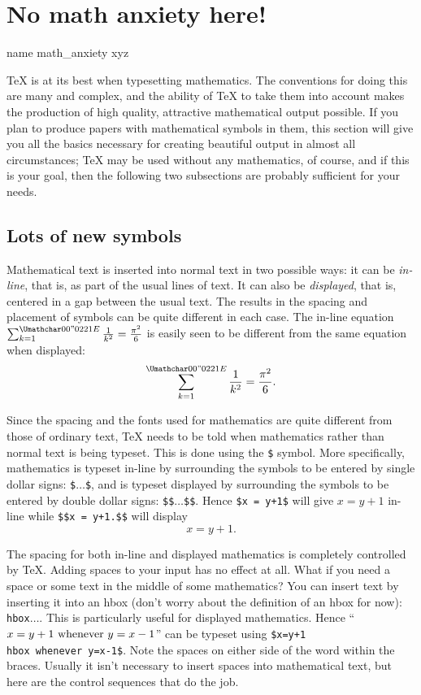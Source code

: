 \section{No math anxiety here!} 
\pdfdest name {math_anxiety} xyz

\TeX{} is at its best when typesetting mathematics.  The 
conventions for doing this are many and complex, and the ability 
of \TeX{} to take them into account makes the production of high 
quality, attractive mathematical output possible.  If you plan to 
produce papers with mathematical symbols in them, this section 
will give you all the basics necessary for creating beautiful 
output in almost all circumstances; \TeX{} may be used without 
any mathematics, of course, and if this is your goal, then the 
following two subsections are probably sufficient for your needs. 

\subsection{Lots of new symbols} 

Mathematical text is inserted into normal text in two possible 
ways: it can be {\sl in-line\/}, that is, as part of the usual 
lines of text.  It can also be {\sl displayed}, that is, centered{} 
in a gap between the usual text.  The results in the spacing and 
placement of symbols can be quite different in each case.  The 
in-line equation $\sum_{k=1}^{\infty} {1\over k^2} = {\pi^2\over6}$ 
is easily seen to be different from the same equation when 
displayed: 
$$\sum_{k=1}^{\infty} {1\over k^2} = {\pi^2\over6}.$$ 

Since the spacing and the fonts used for mathematics are quite 
different from those of ordinary text, \TeX{} needs to be told 
when mathematics rather than normal text is being typeset.  This 
is done using the {\tt\$} symbol.  More specifically, mathematics 
is typeset in-line by surrounding the symbols to be entered by 
single dollar signs: {\tt \$$\ldots$\$}, and is typeset displayed 
by surrounding the symbols to be entered by double dollar signs: 
{\tt \$\$$\ldots$\$\$}\null.  Hence {\tt \$x = y+1\$} will give 
$x=y+1$ in-line while {\tt \$\$x = y+1.\$\$} will display 
$$x=y+1.$$ 

The spacing for both in-line and displayed mathematics is 
completely controlled by \TeX\null.  Adding spaces to your input 
has no effect at all.  What if you need a space or some text in 
the middle of some mathematics?  You can insert text by inserting 
it into an hbox (don't worry about the definition of an hbox for 
now): {\tt \\hbox\lb$\ldots$\rb}\null.  This is particularly 
useful for displayed mathematics.  Hence ``$x=y+1 \hbox{ whenever 
} y=x-1$'' can be typeset using {\tt \$x=y+1 \\hbox\lb\ whenever 
\rb y=x-1\$}. Note the spaces on either side of the word within 
the braces. Usually it isn't necessary to insert spaces into 
mathematical text, but here are the control sequences that do the 
job. 

